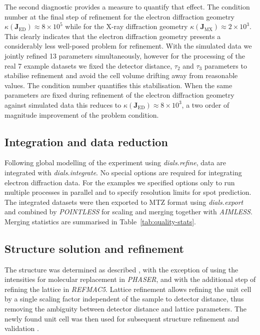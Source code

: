 \documentclass[preprint]{iucr}
\newcommand{\dialsrefine}{\emph{dials.refine}\xspace}
\newcommand{\dialsintegrate}{\emph{dials.integrate}\xspace}
\newcommand{\dialsexport}{\emph{dials.export}\xspace}
\newcommand{\pointless}{\emph{POINTLESS}\xspace}
\newcommand{\aimless}{\emph{AIMLESS}\xspace}
\newcommand{\refmac}{\emph{REFMAC5}\xspace}
\newcommand{\phaser}{\emph{PHASER}\xspace}
\newcommand{\mat}[1]{\mathbf{#1}}
\begin{document}
The second diagnostic provides a measure to quantify that effect. The condition
number at the final step of refinement for the electron diffraction geometry
$\kappa \left( \mat{J}_{\textrm{ED}} \right) \approx 8 \times 10^5$ while for
the X-ray diffraction geometry $\kappa \left( \mat{J}_{\textrm{MX}} \right)
\approx 2 \times 10^3$. This clearly indicates that the electron diffraction
geometry presents a considerably less well-posed problem for refinement. With
the simulated data we jointly refined 13 parameters simultaneously, however for
the processing of the real 7 example datasets we fixed the detector distance,
$\tau_2$ and $\tau_3$ parameters to stabilise refinement and avoid the cell
volume drifting away from reasonable values. The condition number quantifies
this stabilisation. When the same parameters are fixed during refinement of the
electron diffraction geometry against simulated data this reduces to $\kappa
\left( \mat{J}_{\textrm{ED}} \right) \approx 8 \times 10^3$, a two order of
magnitude improvement of the problem condition.

\subsection{Integration and data reduction}

Following global modelling of the experiment using \dialsrefine, data are
integrated with \dialsintegrate. No special options are required for integrating
electron diffraction data. For the examples we specified options only to
run multiple processes in parallel and to specify resolution limits for spot
prediction. The integrated datasets were then exported to MTZ format using
\dialsexport and combined by \pointless \cite{Evans2006} for scaling and merging
together with \aimless \cite{Evans2013}. Merging statistics are summarised in
Table~\ref{tab:quality-stats}.

\subsection{Structure solution and refinement \label{sec:phase-refine}}

The structure was determined as described \cite{Clabbers2017}, with the exception of
using the intensities for molecular replacement in \phaser \cite{McCoy2007,Read2016},
and with the additional step of refining the lattice in \refmac \cite{Murshudov2011}.
Lattice refinement allows refining the unit cell by a single scaling factor independent
of the sample to detector distance, thus removing the ambiguity between detector
distance and lattice parameters. The newly found unit cell was then used for subsequent
structure refinement and validation \cite{Murshudov2011,Joosten2014,Luebben2015}.
\end{document}
